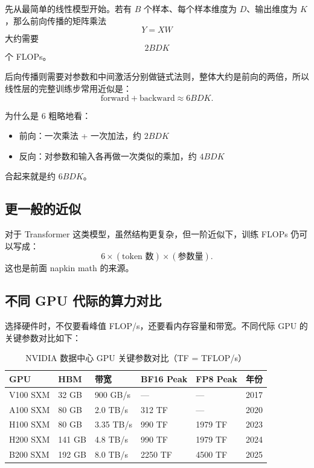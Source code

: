 \documentclass[a4paper]{article}
\begin{document}
先从最简单的线性模型开始。若有 \(B\) 个样本、每个样本维度为 \(D\)、输出维度为 \(K\)，那么前向传播的矩阵乘法
\[
Y = XW
\]
大约需要
\[
2BDK
\]
个 FLOPs。

后向传播则需要对参数和中间激活分别做链式法则，整体大约是前向的两倍，所以线性层的完整训练步常用近似是：
\[
\text{forward} + \text{backward} \approx 6BDK.
\]

\begin{knowledgebox}{为什么是 6}
粗略地看：
\begin{itemize}
    \item 前向：一次乘法 + 一次加法，约 \(2BDK\)
    \item 反向：对参数和输入各再做一次类似的乘加，约 \(4BDK\)
\end{itemize}
合起来就是约 \(6BDK\)。
\end{knowledgebox}

\subsection{更一般的近似}

对于 Transformer 这类模型，虽然结构更复杂，但一阶近似下，训练 FLOPs 仍可以写成：
\[
6 \times (\text{token 数}) \times (\text{参数量}).
\]
这也是前面 napkin math 的来源。

\subsection{不同 GPU 代际的算力对比}

选择硬件时，不仅要看峰值 FLOP/s，还要看内存容量和带宽。不同代际 GPU 的关键参数对比如下：

\begin{table}[H]
\centering
\begin{tabular}{p{}p{}p{}p{}p{}p{}}
\toprule
\textbf{GPU} & \textbf{HBM} & \textbf{带宽} & \textbf{BF16 Peak} & \textbf{FP8 Peak} & \textbf{年份} \\
\midrule
V100 SXM & 32 GB & 900 GB/s & --- & --- & 2017 \\
A100 SXM & 80 GB & 2.0 TB/s & 312 TF & --- & 2020 \\
H100 SXM & 80 GB & 3.35 TB/s & 990 TF & 1979 TF & 2023 \\
H200 SXM & 141 GB & 4.8 TB/s & 990 TF & 1979 TF & 2024 \\
B200 SXM & 192 GB & 8.0 TB/s & 2250 TF & 4500 TF & 2025 \\
\bottomrule
\end{tabular}
\caption{NVIDIA 数据中心 GPU 关键参数对比（TF = TFLOP/s）}
\end{table}
\end{document}
